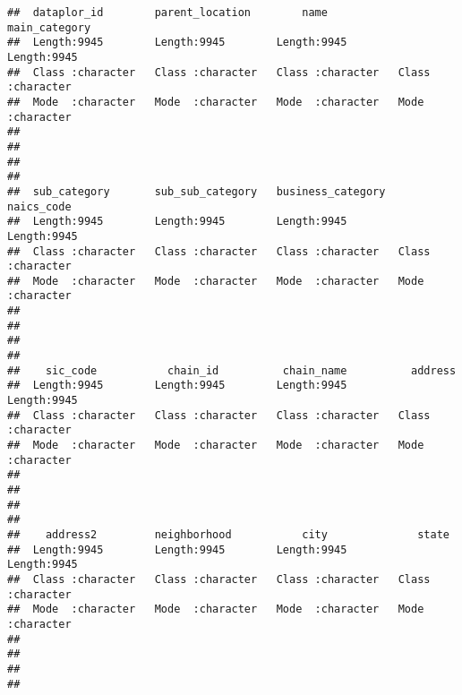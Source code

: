 \documentclass[
]{article}
\begin{document}
\begin{verbatim}
##  dataplor_id        parent_location        name           main_category     
##  Length:9945        Length:9945        Length:9945        Length:9945       
##  Class :character   Class :character   Class :character   Class :character  
##  Mode  :character   Mode  :character   Mode  :character   Mode  :character  
##                                                                             
##                                                                             
##                                                                             
##                                                                             
##  sub_category       sub_sub_category   business_category   naics_code       
##  Length:9945        Length:9945        Length:9945        Length:9945       
##  Class :character   Class :character   Class :character   Class :character  
##  Mode  :character   Mode  :character   Mode  :character   Mode  :character  
##                                                                             
##                                                                             
##                                                                             
##                                                                             
##    sic_code           chain_id          chain_name          address         
##  Length:9945        Length:9945        Length:9945        Length:9945       
##  Class :character   Class :character   Class :character   Class :character  
##  Mode  :character   Mode  :character   Mode  :character   Mode  :character  
##                                                                             
##                                                                             
##                                                                             
##                                                                             
##    address2         neighborhood           city              state          
##  Length:9945        Length:9945        Length:9945        Length:9945       
##  Class :character   Class :character   Class :character   Class :character  
##  Mode  :character   Mode  :character   Mode  :character   Mode  :character  
##                                                                             
##                                                                             
##                                                                             
##                                                                             

\end{verbatim}
\end{document}
